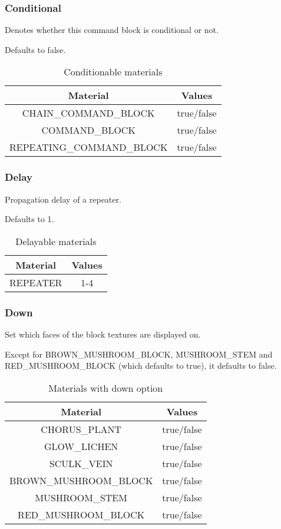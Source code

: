 \subsubsection{Conditional}
Denotes whether this command block is conditional or not.

Defaults to false.

\begin{table}[H]
	\centering
	\begin{tabular}{ |c|c| }
		\hline
		Material & Values \\
		\hline
		CHAIN\_COMMAND\_BLOCK & true/false \\
		COMMAND\_BLOCK & true/false \\
		REPEATING\_COMMAND\_BLOCK & true/false \\
		\hline
	\end{tabular}
	\caption{Conditionable materials}
\end{table}

\subsubsection{Delay}
Propagation delay of a repeater.

Defaults to 1.

\begin{table}[H]
	\centering
	\begin{tabular}{ |c|c| }
		\hline
		Material & Values \\
		\hline
		REPEATER & 1-4 \\
		\hline
	\end{tabular}
	\caption{Delayable materials}
\end{table}

\subsubsection{Down}
Set which faces of the block textures are displayed on.

Except for BROWN\_MUSHROOM\_BLOCK, MUSHROOM\_STEM and RED\_MUSHROOM\_BLOCK (which defaults to true), it defaults to false.


\begin{table}[H]
	\centering
	\begin{tabular}{ |c|c| }
		\hline
		Material & Values \\
		\hline
		CHORUS\_PLANT & true/false \\
		GLOW\_LICHEN & true/false \\
		SCULK\_VEIN & true/false \\
		BROWN\_MUSHROOM\_BLOCK & true/false \\
		MUSHROOM\_STEM & true/false \\
		RED\_MUSHROOM\_BLOCK & true/false \\
		\hline
	\end{tabular}
	\caption{Materials with down option}
\end{table}

